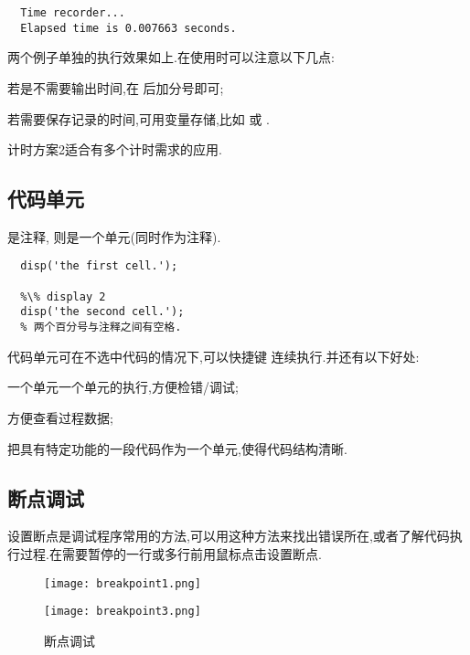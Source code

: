 \vspace{-0.8cm}
\begin{lstlisting}
  Time recorder...
  Elapsed time is 0.007663 seconds.
\end{lstlisting}

两个例子单独的执行效果如上.在使用时可以注意以下几点:
\begindot
  \item 若是不需要输出时间,在  后加分号即可;
  \item 若需要保存记录的时间,可用变量存储,比如  或  .
  \item 计时方案2适合有多个计时需求的应用.
\myenddot




\subsection{代码单元}
\mcode{\%} 是注释, \mcode{\%\%} 则是一个单元(同时作为注释). 

\vspace{-0.8cm}
\begin{lstlisting}[caption=代码单元]
  %\% display 1
  disp('the first cell.');

  %\% display 2
  disp('the second cell.');
  % 两个百分号与注释之间有空格.
\end{lstlisting}

代码单元可在不选中代码的情况下,可以快捷键  连续执行.并还有以下好处:
\begindot
  \item 一个单元一个单元的执行,方便检错/调试;
  \item 方便查看过程数据;
  \item 把具有特定功能的一段代码作为一个单元,使得代码结构清晰.
\myenddot



\subsection{断点调试}
设置断点是调试程序常用的方法,可以用这种方法来找出错误所在,或者了解代码执行过程.在需要暂停的一行或多行前用鼠标点击设置断点.

\begin{figure}[htbp]
  \centering
  \texttt{[image: breakpoint1.png]}
\end{figure}

\begin{figure}[htbp]
  \centering
  \texttt{[image: breakpoint3.png]}
  \caption{断点调试}
\end{figure}

